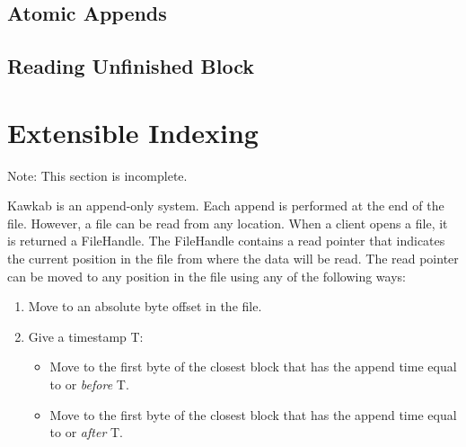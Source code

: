 \documentclass[]{article}
\newcommand{\hl}[1]{\textcolor{hlcolor}{#1}}
\begin{document}
%
%


\subsection{Atomic Appends}

\subsection{Reading Unfinished Block}


\section{Extensible Indexing}

\hl{Note: This section is incomplete.}

Kawkab is an append-only system. Each append is performed at the end of the file.
However, a file can be read from any location. When a client opens a file,
it is returned a FileHandle. The FileHandle contains a read pointer that indicates
the current position in the file from where the data will be read. The read
pointer can be moved to any position in the file using any of the following
ways: 

\begin{enumerate}
  \item Move to an absolute byte offset in the file.
  \item Give a timestamp T:
  \begin{itemize}
    \item Move to the first byte of the closest block that has the append time equal to
          or \textit{before} T.
    \item Move to the first byte of the closest block that has the append time equal to
          or \textit{after} T.
  \end{itemize}
\end{enumerate}
\end{document}

